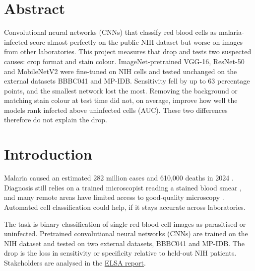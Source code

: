 \documentclass[11pt,a4paper]{article}
\newcommand{\myName}{Noah Tjon Sien Kie}
\newlength{\bodytitleskip}\setlength{\bodytitleskip}{23.1pt}
\newlength{\bodygapA}\setlength{\bodygapA}{31.4pt}
\newlength{\bodygapB}\setlength{\bodygapB}{13.6pt}
\begin{document}
\clearpage
\pagestyle{scrheadings}
\rofoot[{\small\thepage}]{}
\setcounter{page}{1}
\thispagestyle{plain}

\begin{center}
  \vspace*{\bodytitleskip}
  {\LARGE\rmfamily\normalfont{}\par}
  \vspace{\bodygapA}
  {\normalsize\spacedlowsmallcaps{\myName}\par}
  \vspace{\bodygapB}
\end{center}

\section*{Abstract}

Convolutional neural networks (CNNs) that classify red blood cells as malaria-infected score almost perfectly on the public NIH dataset but worse on images from other laboratories. This project measures that drop and tests two suspected causes: crop format and stain colour. ImageNet-pretrained VGG-16, ResNet-50 and \mbox{MobileNetV2} were fine-tuned on NIH cells and tested unchanged on the external datasets BBBC041 and MP-IDB. Sensitivity fell by up to 63 percentage points, and the smallest network lost the most. Removing the background or matching stain colour at test time did not, on average, improve how well the models rank infected above uninfected cells (AUC). These two differences therefore do not explain the drop.

\section{Introduction}

Malaria caused an estimated 282 million cases and 610,000 deaths in 2024 \citep{who2025}. Diagnosis still relies on a trained microscopist reading a stained blood smear \citep{rajaraman2018}, and many remote areas have limited access to good-quality microscopy \citep{whordt}. Automated cell classification could help, if it stays accurate across laboratories.

The task is binary classification of single red-blood-cell images as parasitised or uninfected. Pretrained convolutional neural networks (CNNs) are trained on the NIH dataset and tested on two external datasets, BBBC041 and MP-IDB. The drop is the loss in sensitivity or specificity relative to held-out NIH patients. Stakeholders are analysed in the \href{https://gitlab.uvt.nl/capstone/2026-fall/u927271/-/blob/main/docs/elsa_report_v3.md}{ELSA report}.
\end{document}
